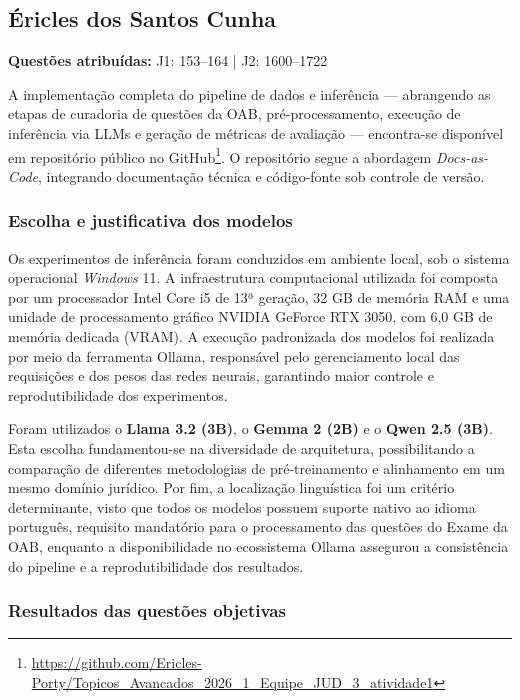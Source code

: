 \documentclass[12pt,a4paper]{article}
\begin{document}

\subsection{Éricles dos Santos Cunha}

\textbf{Questões atribuídas:} J1: 153--164 | J2: 1600--1722

A implementação completa do pipeline de dados e inferência — abrangendo as etapas de curadoria de questões da OAB, pré-processamento, execução de inferência via LLMs e geração de métricas de avaliação — encontra-se disponível em repositório público no GitHub\footnote{\url{https://github.com/Ericles-Porty/Topicos_Avancados_2026_1_Equipe_JUD_3_atividade1}}. O repositório segue a abordagem \textit{Docs-as-Code}, integrando documentação técnica e código-fonte sob controle de versão.


\subsubsection{Escolha e justificativa dos modelos}

Os experimentos de inferência foram conduzidos em ambiente local, sob o sistema operacional \textit{Windows} 11. A infraestrutura computacional utilizada foi composta por um processador Intel Core i5 de 13ª geração, 32 GB de memória RAM e uma unidade de processamento gráfico NVIDIA GeForce RTX 3050, com 6,0 GB de memória dedicada (VRAM). A execução padronizada dos modelos foi realizada por meio da ferramenta Ollama, responsável pelo gerenciamento local das requisições e dos pesos das redes neurais, garantindo maior controle e reprodutibilidade dos experimentos.

Foram utilizados o \textbf{Llama 3.2 (3B)}, o \textbf{Gemma 2 (2B)} e o \textbf{Qwen 2.5 (3B)}. Esta escolha fundamentou-se na diversidade de arquitetura, possibilitando a comparação de diferentes metodologias de pré-treinamento e alinhamento em um mesmo domínio jurídico. Por fim, a localização linguística foi um critério determinante, visto que todos os modelos possuem suporte nativo ao idioma português, requisito mandatório para o processamento das questões do Exame da OAB, enquanto a disponibilidade no ecossistema Ollama assegurou a consistência do pipeline e a reprodutibilidade dos resultados.

\subsubsection{Resultados das questões objetivas}
\end{document}
